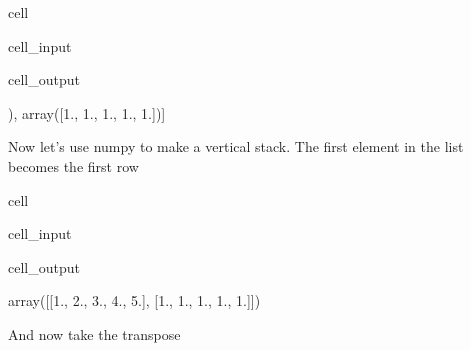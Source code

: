 \documentclass[letterpaper,10pt,english]{jupyterBook}
\begin{document}
\begin{sphinxuseclass}{cell}\begin{sphinxVerbatimInput}

\begin{sphinxuseclass}{cell_input}
\begin{sphinxVerbatim}[commandchars=\\\{\}]
\PYG{p}{[}\PYG{p}{]}
\end{sphinxVerbatim}

\end{sphinxuseclass}\end{sphinxVerbatimInput}
\begin{sphinxVerbatimOutput}

\begin{sphinxuseclass}{cell_output}
\begin{sphinxVerbatim}[commandchars=\\\{\}]
[array([1, 2, 3, 4, 5]), array([1., 1., 1., 1., 1.])]
\end{sphinxVerbatim}

\end{sphinxuseclass}\end{sphinxVerbatimOutput}

\end{sphinxuseclass}
\sphinxAtStartPar
Now let’s use numpy to make a vertical stack. The first element in the list becomes the first row

\begin{sphinxuseclass}{cell}\begin{sphinxVerbatimInput}

\begin{sphinxuseclass}{cell_input}
\begin{sphinxVerbatim}[commandchars=\\\{\}]
\PYG{p}{[} \PYG{p}{]}
\end{sphinxVerbatim}

\end{sphinxuseclass}\end{sphinxVerbatimInput}
\begin{sphinxVerbatimOutput}

\begin{sphinxuseclass}{cell_output}
\begin{sphinxVerbatim}[commandchars=\\\{\}]
array([[1., 2., 3., 4., 5.],
       [1., 1., 1., 1., 1.]])
\end{sphinxVerbatim}

\end{sphinxuseclass}\end{sphinxVerbatimOutput}

\end{sphinxuseclass}
\sphinxAtStartPar
And now take the transpose
\end{document}
